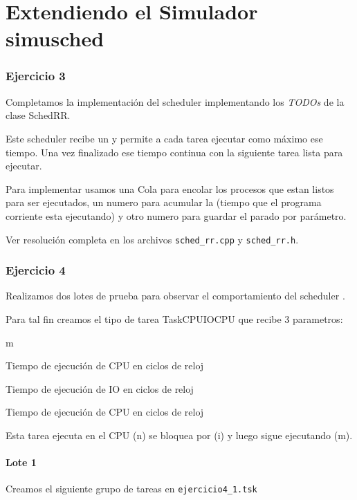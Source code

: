 


\part{Extendiendo el Simulador simusched}

\section{Ejercicio 3}

Completamos la implementaci\'on del scheduler \rr implementando los \textit{TODOs} de la clase SchedRR.

Este scheduler recibe un \quantum y permite a cada tarea ejecutar como m\'aximo ese tiempo. Una vez finalizado ese tiempo continua con la siguiente tarea lista para ejecutar.

Para implementar \rr usamos una Cola para encolar los procesos que estan listos para ser ejecutados, un numero para acumular la \quota (tiempo que el programa corriente esta ejecutando) y otro numero para guardar el \quantum parado por par\'ametro.

Ver resoluci\'on completa en los archivos \verb|sched_rr.cpp| y \verb|sched_rr.h|.

\section{Ejercicio 4}

Realizamos dos lotes de prueba para observar el comportamiento del scheduler \rr. 

Para tal fin creamos el tipo de tarea TaskCPUIOCPU que recibe 3 parametros:

\begin{mydescription}{m}
 \item[n] Tiempo de ejecuci\'on de CPU en ciclos de reloj
 \item[i] Tiempo de ejecuci\'on de IO en ciclos de reloj
 \item[m] Tiempo de ejecuci\'on de CPU en ciclos de reloj
\end{mydescription}

Esta tarea ejecuta en el CPU (n) se bloquea por (i) y luego sigue ejecutando (m).

\subsection{Lote 1}

Creamos el siguiente grupo de tareas en \verb|ejercicio4_1.tsk|

